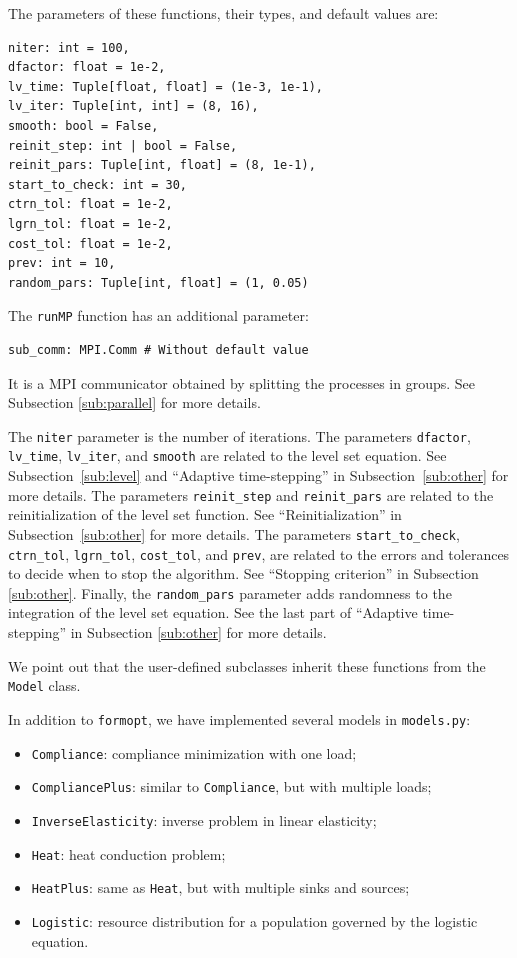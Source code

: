 \documentclass[preprint,9pt]{elsarticle}
\begin{document}
The parameters of these functions, their types, and default values are:
\begin{lstlisting}
niter: int = 100,
dfactor: float = 1e-2,
lv_time: Tuple[float, float] = (1e-3, 1e-1),
lv_iter: Tuple[int, int] = (8, 16),
smooth: bool = False,
reinit_step: int | bool = False,
reinit_pars: Tuple[int, float] = (8, 1e-1),
start_to_check: int = 30,
ctrn_tol: float = 1e-2,
lgrn_tol: float = 1e-2,
cost_tol: float = 1e-2,
prev: int = 10,
random_pars: Tuple[int, float] = (1, 0.05)
\end{lstlisting}
The \texttt{runMP} function has an additional parameter:
\begin{lstlisting}
sub_comm: MPI.Comm # Without default value
\end{lstlisting}
It is a MPI communicator obtained by splitting the processes in groups.
See Subsection \ref{sub:parallel} for more details.

The \texttt{niter} parameter is the number of iterations.
The parameters \texttt{dfactor}, \texttt{lv\_time}, \texttt{lv\_iter},
and \texttt{smooth} are related to the level set equation.
See Subsection~\ref{sub:level} and ``Adaptive time-stepping''
in Subsection~\ref{sub:other} for more details.
The parameters \texttt{reinit\_step} and \texttt{reinit\_pars}
are related to the reinitialization of the level set function.
See ``Reinitialization'' in Subsection~\ref{sub:other} for more details.
The parameters \texttt{start\_to\_check}, \texttt{ctrn\_tol},
\texttt{lgrn\_tol}, \texttt{cost\_tol}, and \texttt{prev}, are related
to the errors and tolerances to decide when to stop the algorithm.
See ``Stopping criterion'' in Subsection \ref{sub:other}.
Finally, the \texttt{random\_pars} parameter adds randomness
to the integration of the level set equation.
See the last part of ``Adaptive time-stepping''
in Subsection \ref{sub:other} for more details.

We point out that the user-defined subclasses inherit
these functions from the \texttt{Model} class.

In addition to \texttt{formopt},
we have implemented several models in \texttt{models.py}:
\begin{itemize}
\item \texttt{Compliance}: compliance minimization with one load;
\item \texttt{CompliancePlus}: similar to \texttt{Compliance},
		but with multiple loads;
\item \texttt{InverseElasticity}: inverse problem in linear elasticity;
\item \texttt{Heat}: heat conduction problem;
\item \texttt{HeatPlus}: same as \texttt{Heat},
		but with multiple sinks and sources;
\item \texttt{Logistic}: resource distribution for a population
		governed by the logistic equation.
\end{itemize}
\end{document}
